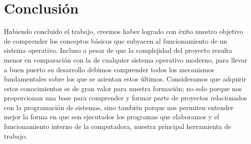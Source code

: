 \section{Conclusión}

  Habiendo concluido el trabajo, creemos haber logrado con éxito nuestro objetivo de comprender los conceptos básicos que subyacen al funcionamiento de un sistema operativo. Incluso a pesar de que la complejidad del proyecto resulta menor en comparación con la de cualquier sistema operativo moderno, para llevar a buen puerto su desarrollo debimos comprender todos los mecanismos fundamentales sobre los que se asientan estos últimos. Consideramos que adquirir estos conocimientos es de gran valor para nuestra formación; no solo porque nos proporcionan una base para comprender y formar parte de proyectos relacionados con la programación de sistemas, sino también porque nos permiten entender mejor la forma en que son ejecutados los programas que elaboramos y el funcionamiento interno de la computadora, nuestra principal herramienta de trabajo.